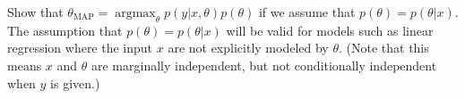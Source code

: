 \item {} Show that $\theta_{\text{MAP}} =
\operatorname*{argmax}_\theta p(y|x, \theta) p(\theta)$ if we assume that
$p(\theta) = p(\theta | x)$. The assumption that $p(\theta) = p(\theta | x)$
will be valid for models such as linear regression where the input $x$
are not explicitly modeled by $\theta$.
(Note that this means $x$ and $\theta$ are marginally independent, but not
conditionally independent when $y$ is given.)


